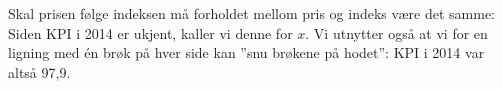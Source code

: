 




\footnotesize


\sv
Skal prisen følge indeksen må forholdet mellom pris og indeks være det samme:
Siden KPI i 2014 er ukjent, kaller vi denne for $ x $. Vi utnytter også at vi for en ligning med én brøk på hver side kan ''snu brøkene på hodet'':
KPI i 2014 var altså 97,9.





